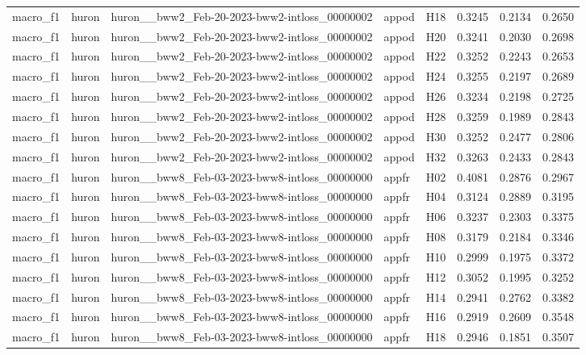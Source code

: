 \begin{table}[tbp]
\begin{tabular}{lllllrrr}
macro\_f1 & huron & huron\_\_bww2\_Feb-20-2023-bww2-intloss\_00000002 & appod & H18 & 0.3245 & 0.2134 & 0.2650 \\
macro\_f1 & huron & huron\_\_bww2\_Feb-20-2023-bww2-intloss\_00000002 & appod & H20 & 0.3241 & 0.2030 & 0.2698 \\
macro\_f1 & huron & huron\_\_bww2\_Feb-20-2023-bww2-intloss\_00000002 & appod & H22 & 0.3252 & 0.2243 & 0.2653 \\
macro\_f1 & huron & huron\_\_bww2\_Feb-20-2023-bww2-intloss\_00000002 & appod & H24 & 0.3255 & 0.2197 & 0.2689 \\
macro\_f1 & huron & huron\_\_bww2\_Feb-20-2023-bww2-intloss\_00000002 & appod & H26 & 0.3234 & 0.2198 & 0.2725 \\
macro\_f1 & huron & huron\_\_bww2\_Feb-20-2023-bww2-intloss\_00000002 & appod & H28 & 0.3259 & 0.1989 & 0.2843 \\
macro\_f1 & huron & huron\_\_bww2\_Feb-20-2023-bww2-intloss\_00000002 & appod & H30 & 0.3252 & 0.2477 & 0.2806 \\
macro\_f1 & huron & huron\_\_bww2\_Feb-20-2023-bww2-intloss\_00000002 & appod & H32 & 0.3263 & 0.2433 & 0.2843 \\
macro\_f1 & huron & huron\_\_bww8\_Feb-03-2023-bww8-intloss\_00000000 & appfr & H02 & 0.4081 & 0.2876 & 0.2967 \\
macro\_f1 & huron & huron\_\_bww8\_Feb-03-2023-bww8-intloss\_00000000 & appfr & H04 & 0.3124 & 0.2889 & 0.3195 \\
macro\_f1 & huron & huron\_\_bww8\_Feb-03-2023-bww8-intloss\_00000000 & appfr & H06 & 0.3237 & 0.2303 & 0.3375 \\
macro\_f1 & huron & huron\_\_bww8\_Feb-03-2023-bww8-intloss\_00000000 & appfr & H08 & 0.3179 & 0.2184 & 0.3346 \\
macro\_f1 & huron & huron\_\_bww8\_Feb-03-2023-bww8-intloss\_00000000 & appfr & H10 & 0.2999 & 0.1975 & 0.3372 \\
macro\_f1 & huron & huron\_\_bww8\_Feb-03-2023-bww8-intloss\_00000000 & appfr & H12 & 0.3052 & 0.1995 & 0.3252 \\
macro\_f1 & huron & huron\_\_bww8\_Feb-03-2023-bww8-intloss\_00000000 & appfr & H14 & 0.2941 & 0.2762 & 0.3382 \\
macro\_f1 & huron & huron\_\_bww8\_Feb-03-2023-bww8-intloss\_00000000 & appfr & H16 & 0.2919 & 0.2609 & 0.3548 \\
macro\_f1 & huron & huron\_\_bww8\_Feb-03-2023-bww8-intloss\_00000000 & appfr & H18 & 0.2946 & 0.1851 & 0.3507 \\

\end{tabular}
\end{table}
